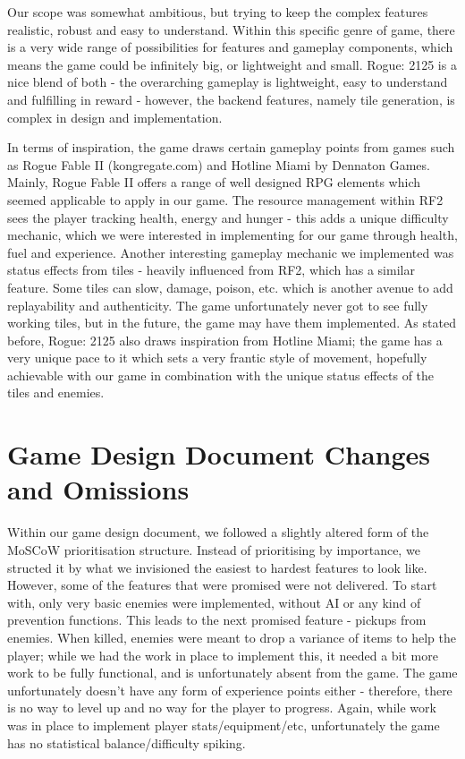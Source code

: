\documentclass[12pt]{article}
\begin{document}
Our scope was somewhat ambitious, but trying to keep the complex features realistic, robust and easy to understand. Within this specific genre of game, there is a very wide range of possibilities for features and gameplay components, which means the game could be infinitely big, or lightweight and small. Rogue: 2125 is a nice blend of both - the overarching gameplay is lightweight, easy to understand and fulfilling in reward - however, the backend features, namely tile generation, is complex in design and implementation. \linebreak

In terms of inspiration, the game draws certain gameplay points from games such as Rogue Fable II (kongregate.com) and Hotline Miami by Dennaton Games. Mainly, Rogue Fable II offers a range of well designed RPG elements which seemed applicable to apply in our game. The resource management within RF2 sees the player tracking health, energy and hunger - this adds a unique difficulty mechanic, which we were interested in implementing for our game through health, fuel and experience. Another interesting gameplay mechanic we implemented was status effects from tiles - heavily influenced from RF2, which has a similar feature. Some tiles can slow, damage, poison, etc. which is another avenue to add replayability and authenticity. The game unfortunately never got to see fully working tiles, but in the future, the game may have them implemented. As stated before, Rogue: 2125 also draws inspiration from Hotline Miami; the game has a very unique pace to it which sets a very frantic style of movement, hopefully achievable with our game in combination with the unique status effects of the tiles and enemies.

\clearpage

\section{Game Design Document Changes and Omissions}

Within our game design document, we followed a slightly altered form of the MoSCoW prioritisation structure. Instead of prioritising by importance, we structed it by what we invisioned the easiest to hardest features to look like. However, some of the features that were promised were not delivered. To start with, only very basic enemies were implemented, without AI or any kind of prevention functions. This leads to the next promised feature - pickups from enemies. When killed, enemies were meant to drop a variance of items to help the player; while we had the work in place to implement this, it needed a bit more work to be fully functional, and is unfortunately absent from the game. The game unfortunately doesn't have any form of experience points either - therefore, there is no way to level up and no way for the player to progress. Again, while work was in place to implement player stats/equipment/etc, unfortunately the game has no statistical balance/difficulty spiking. \newline
\end{document}
